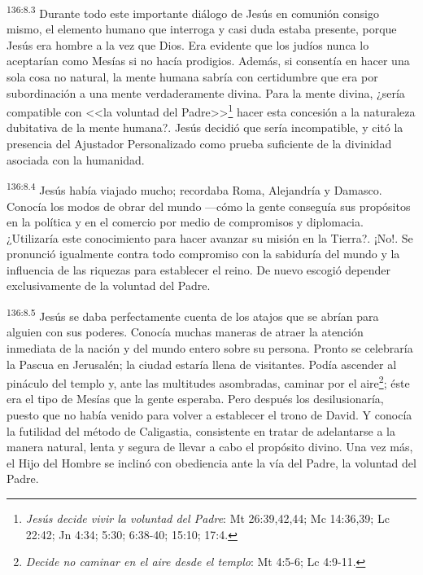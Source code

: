 \par 
\textsuperscript{136:8.3} Durante todo este importante diálogo de Jesús en comunión consigo mismo, el elemento humano que interroga y casi duda estaba presente, porque Jesús era hombre a la vez que Dios. Era evidente que los judíos nunca lo aceptarían como Mesías si no hacía prodigios. Además, si consentía en hacer una sola cosa no natural, la mente humana sabría con certidumbre que era por subordinación a una mente verdaderamente divina. Para la mente divina, ¿sería compatible con <<la voluntad del Padre>>\footnote{\textit{Jesús decide vivir la voluntad del Padre}: Mt 26:39,42,44; Mc 14:36,39; Lc 22:42; Jn 4:34; 5:30; 6:38-40; 15:10; 17:4.} hacer esta concesión a la naturaleza dubitativa de la mente humana?. Jesús decidió que sería incompatible, y citó la presencia del Ajustador Personalizado como prueba suficiente de la divinidad asociada con la humanidad.

\par 
\textsuperscript{136:8.4} Jesús había viajado mucho; recordaba Roma, Alejandría y Damasco. Conocía los modos de obrar del mundo ---cómo la gente conseguía sus propósitos en la política y en el comercio por medio de compromisos y diplomacia. ¿Utilizaría este conocimiento para hacer avanzar su misión en la Tierra?. ¡No!. Se pronunció igualmente contra todo compromiso con la sabiduría del mundo y la influencia de las riquezas para establecer el reino. De nuevo escogió depender exclusivamente de la voluntad del Padre.

\par 
\textsuperscript{136:8.5} Jesús se daba perfectamente cuenta de los atajos que se abrían para alguien con sus poderes. Conocía muchas maneras de atraer la atención inmediata de la nación y del mundo entero sobre su persona. Pronto se celebraría la Pascua en Jerusalén; la ciudad estaría llena de visitantes. Podía ascender al pináculo del templo y, ante las multitudes asombradas, caminar por el aire\footnote{\textit{Decide no caminar en el aire desde el templo}: Mt 4:5-6; Lc 4:9-11.}; éste era el tipo de Mesías que la gente esperaba. Pero después los desilusionaría, puesto que no había venido para volver a establecer el trono de David. Y conocía la futilidad del método de Caligastia, consistente en tratar de adelantarse a la manera natural, lenta y segura de llevar a cabo el propósito divino. Una vez más, el Hijo del Hombre se inclinó con obediencia ante la vía del Padre, la voluntad del Padre.

